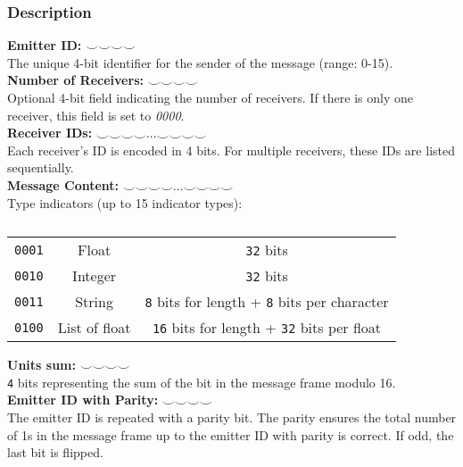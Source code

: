 \documentclass[main.tex]{subfiles}
\begin{document}
\subsubsection{Description}

\textbf{Emitter ID:} $\smallsmile \smallsmile \smallsmile \smallsmile$\\
The unique 4-bit identifier for the sender of the message (range: 0-15).\\

\textbf{Number of Receivers:} $\smallsmile \smallsmile \smallsmile \smallsmile$\\
Optional 4-bit field indicating the number of receivers. If there is only one receiver, this field is set to \textit{0000}.\\

\textbf{Receiver IDs:} $\smallsmile \smallsmile \smallsmile \smallsmile \dots \smallsmile \smallsmile \smallsmile \smallsmile$\\
Each receiver's ID is encoded in 4 bits. For multiple receivers, these IDs are listed sequentially.\\

\textbf{Message Content:} $\smallsmile \smallsmile \smallsmile \smallsmile \dots \smallsmile \smallsmile \smallsmile \smallsmile$\\

Type indicators (up to 15 indicator types):\\
\begin{table}[H]
	\centering
	\begin{tabular}{c c c}
		\texttt{0001} & Float & \texttt{32} bits\\
		\texttt{0010} & Integer & \texttt{32} bits\\
		\texttt{0011} & String & \texttt{8} bits for length + \texttt{8} bits per character\\
		\texttt{0100} & List of float & \texttt{16} bits for length + \texttt{32} bits per float\\
	\end{tabular}
	\caption{}
\end{table}

\textbf{Units sum:} $\smallsmile \smallsmile \smallsmile \smallsmile$\\
\texttt{4} bits representing the sum of the bit in the message frame modulo 16. \\ 

\textbf{Emitter ID with Parity:} $\smallsmile \smallsmile \smallsmile \smallsmile$\\
The emitter ID is repeated with a parity bit. The parity ensures the total number of 1s in the message frame up to the emitter ID with parity is correct. If odd, the last bit is flipped. \\
\end{document}
